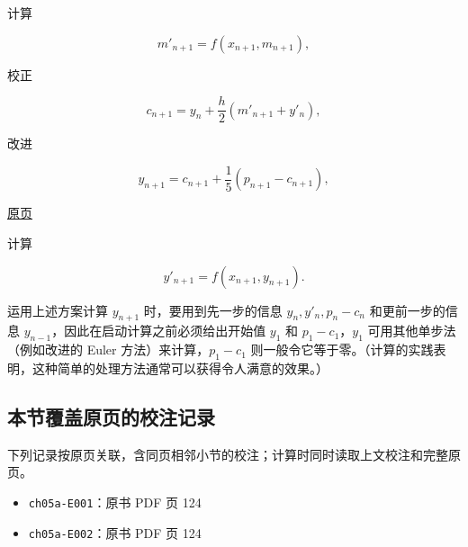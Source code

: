 \documentclass[
  10pt,
  fontset=fandol]{ctexart}
\providecommand{\tightlist}{%
  \setlength{\itemsep}{0pt}\setlength{\parskip}{0pt}}
\begin{document}
计算

\[
m'_{n+1}=f(x_{n+1},m_{n+1}),
\]

校正

\[
c_{n+1}=y_n+\frac{h}{2}(m'_{n+1}+y'_n),
\]

改进

\[
y_{n+1}=c_{n+1}+\frac{1}{5}(p_{n+1}-c_{n+1}),
\]

\href{../../source-images/pdf-126.jpeg}{原页}

计算

\[
y'_{n+1}=f(x_{n+1},y_{n+1}).
\]

运用上述方案计算 \(y_{n+1}\) 时，要用到先一步的信息 \(y_n,y'_n,p_n-c_n\) 和更前一步的信息 \(y_{n-1}\)，因此在启动计算之前必须给出开始值 \(y_1\) 和 \(p_1-c_1\)，\(y_1\) 可用其他单步法（例如改进的 Euler 方法）来计算，\(p_1-c_1\) 则一般令它等于零。（计算的实践表明，这种简单的处理方法通常可以获得令人满意的效果。）

\subsection{本节覆盖原页的校注记录}\label{ux672cux8282ux8986ux76d6ux539fux9875ux7684ux6821ux6ce8ux8bb0ux5f55}

下列记录按原页关联，含同页相邻小节的校注；计算时同时读取上文校注和完整原页。

\begin{itemize}
\tightlist
\item
  \texttt{ch05a-E001}：原书 PDF 页 124
\item
  \texttt{ch05a-E002}：原书 PDF 页 124
\end{itemize}
\end{document}
